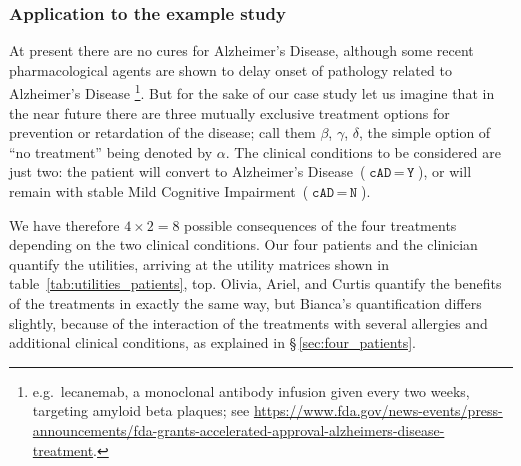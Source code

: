 \documentclass[utf8]{FrontiersinHarvard_mod} %
\newcommand*{\mo}[1][=]{\mathord{\,#1\,}}
\newcommand*{\sect}{\S}%
\newcommand*{\eg}{{e.g.}}
\renewcommand*{\|}[1][]{\nonscript\:#1\vert\nonscript\:\mathopen{}}
\newcommand*{\cad}{\texttt{cAD}}
\newcommand*{\yes}{\texttt{Y}}
\newcommand*{\no}{\texttt{N}}
\newcommand*{\ad}{Alzheimer's Disease}
\newcommand*{\mci}{Mild Cognitive Impairment}
\begin{document}
\subsubsection{Application to the example study}
\label{sec:expected_utility_application}

At present there are no cures for \ad, although some recent pharmacological agents are shown to delay onset of pathology related to \ad%
\footnote{\eg\ lecanemab, a monoclonal antibody infusion given every two weeks, targeting amyloid beta plaques; see \url{https://www.fda.gov/news-events/press-announcements/fda-grants-accelerated-approval-alzheimers-disease-treatment}.}. But for the sake of our case study let us imagine that in the near future there are three mutually exclusive treatment options for prevention or retardation of the disease; call them $\beta$, $\gamma$, $\delta$, the simple option of \enquote{no treatment} being denoted by $\alpha$. The clinical conditions to be considered are just two: the patient will convert to \ad\ ($\cad\mo\yes$), or will remain with stable \mci\ ($\cad\mo\no$).

We have therefore $4 \times 2 = 8$ possible consequences of the four treatments depending on the two clinical conditions. Our four patients and the clinician quantify the utilities, arriving at the utility matrices shown in table~\ref{tab:utilities_patients}, top. Olivia, Ariel, and Curtis quantify the benefits of the treatments in exactly the same way, but Bianca's quantification differs slightly, because of the interaction of the treatments with several allergies and additional clinical conditions, as explained in \sect\,\ref{sec:four_patients}.
\end{document}
